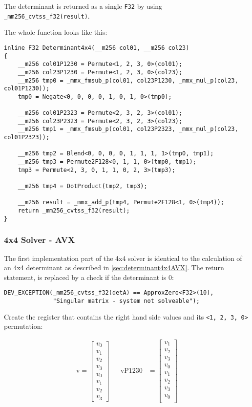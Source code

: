 \documentclass[]{scrartcl}
\begin{document}
The determinant is returned as a single \texttt{F32} by using \texttt{_mm256_cvtss_f32(result)}.

The whole function looks like this:
\begin{verbatim}
inline F32 Determinant4x4(__m256 col01, __m256 col23)
{
    __m256 col01P1230 = Permute<1, 2, 3, 0>(col01);
    __m256 col23P1230 = Permute<1, 2, 3, 0>(col23);
    __m256 tmp0 = _mmx_fmsub_p(col01, col23P1230, _mmx_mul_p(col23, col01P1230));
    tmp0 = Negate<0, 0, 0, 0, 1, 0, 1, 0>(tmp0);

    __m256 col01P2323 = Permute<2, 3, 2, 3>(col01);
    __m256 col23P2323 = Permute<2, 3, 2, 3>(col23);
    __m256 tmp1 = _mmx_fmsub_p(col01, col23P2323, _mmx_mul_p(col23, col01P2323));

    __m256 tmp2 = Blend<0, 0, 0, 0, 1, 1, 1, 1>(tmp0, tmp1);
    __m256 tmp3 = Permute2F128<0, 1, 1, 0>(tmp0, tmp1);
    tmp3 = Permute<2, 3, 0, 1, 1, 0, 2, 3>(tmp3);

    __m256 tmp4 = DotProduct(tmp2, tmp3);

    __m256 result = _mmx_add_p(tmp4, Permute2F128<1, 0>(tmp4));
    return _mm256_cvtss_f32(result);
}
\end{verbatim}

\subsubsection{4x4 Solver - AVX}

The first implementation part of the 4x4 solver is identical to the calculation of an 4x4 determinant as described in \cref{sec:determinant4x4AVX}. The return statement, is replaced by a check if the determinant is 0:
\begin{verbatim}
DEV_EXCEPTION(_mm256_cvtss_f32(detA) == ApproxZero<F32>(10), 
              "Singular matrix - system not solveable");
\end{verbatim} 

Create the register that contains the right hand side values and its 
\texttt{<1, 2, 3, 0>} permutation:

\begin{align*}
\mathrm{v} 
=
\begin{bmatrix}
v_0\\
v_1\\
v_2\\
v_3\\
v_0\\
v_1\\
v_2\\
v_3
\end{bmatrix}
&&
\mathrm{vP1230} 
&=
\begin{bmatrix}
v_1\\
v_2\\
v_3\\
v_0\\
v_1\\
v_2\\
v_3\\
v_0\\
\end{bmatrix}
\end{align*}
\end{document}

